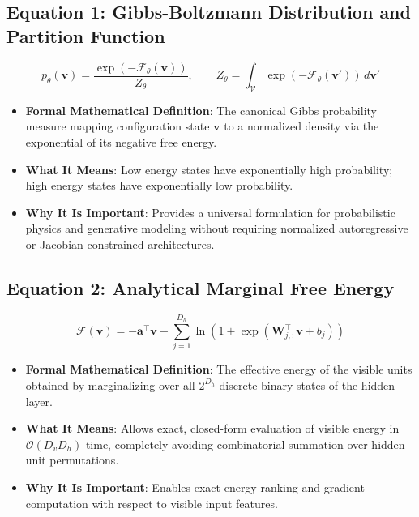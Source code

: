 \documentclass[11pt,a4paper]{article}
\theoremstyle{definition}
\begin{document}
\subsection{\textbf{Equation 1: Gibbs-Boltzmann Distribution and Partition Function}}
{\boldmath
\begin{equation}
p_\theta(\mathbf{v}) = \frac{\exp(-\mathcal{F}_\theta(\mathbf{v}))}{Z_\theta}, \qquad Z_\theta = \int_{\mathcal{V}} \exp(-\mathcal{F}_\theta(\mathbf{v}')) \, d\mathbf{v}'
\end{equation}
}
\begin{itemize}
    \item \textbf{Formal Mathematical Definition}:
    The canonical Gibbs probability measure mapping configuration state $\mathbf{v}$ to a normalized density via the exponential of its negative free energy.
    \item \textbf{What It Means}:
    Low energy states have exponentially high probability; high energy states have exponentially low probability.
    \item \textbf{Why It Is Important}:
    Provides a universal formulation for probabilistic physics and generative modeling without requiring normalized autoregressive or Jacobian-constrained architectures.
\end{itemize}

\subsection{\textbf{Equation 2: Analytical Marginal Free Energy}}
{\boldmath
\begin{equation}
\mathcal{F}(\mathbf{v}) = -\mathbf{a}^\top \mathbf{v} - \sum_{j=1}^{D_h} \ln\left( 1 + \exp\left( \mathbf{W}_{j, :}^\top \mathbf{v} + b_j \right) \right)
\end{equation}
}
\begin{itemize}
    \item \textbf{Formal Mathematical Definition}:
    The effective energy of the visible units obtained by marginalizing over all $2^{D_h}$ discrete binary states of the hidden layer.
    \item \textbf{What It Means}:
    Allows exact, closed-form evaluation of visible energy in $\mathcal{O}(D_v D_h)$ time, completely avoiding combinatorial summation over hidden unit permutations.
    \item \textbf{Why It Is Important}:
    Enables exact energy ranking and gradient computation with respect to visible input features.
\end{itemize}
\end{document}
